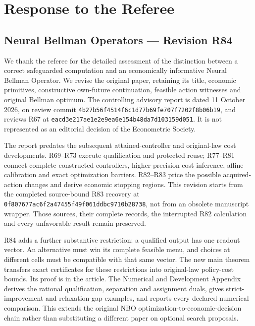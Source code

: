 \hypertarget{response-to-the-referee}{%
\section{Response to the Referee}\label{response-to-the-referee}}

\hypertarget{neural-bellman-operators-revision-r84}{%
\subsection{Neural Bellman Operators --- Revision
R84}\label{neural-bellman-operators-revision-r84}}

We thank the referee for the detailed assessment of the distinction
between a correct safeguarded computation and an economically
informative Neural Bellman Operator. We revise the original paper,
retaining its title, economic primitives, constructive own-future
continuation, feasible action witnesses and original Bellman optimum.
The controlling advisory report is dated 11 October 2026, on review
commit \texttt{4b27b56f4514f6c1d77b69fe707f7202f8b06b19}, and reviews
R67 at \texttt{eacd3e217ae1e2e9ea6e154b48da7d103159d051}. It is not
represented as an editorial decision of the Econometric Society.

The report predates the subsequent attained-controller and original-law
cost developments. R69--R73 execute qualification and protected reuse;
R77--R81 connect complete constructed controllers, higher-precision cost
inference, affine calibration and exact optimization barriers. R82--R83
price the possible acquired-action changes and derive economic stopping
regions. This revision starts from the completed source-bound R83
recovery at \texttt{0f807677ac6f2a47455f49f061ddbc9710b28738}, not from
an obsolete manuscript wrapper. Those sources, their complete records,
the interrupted R82 calculation and every unfavorable result remain
preserved.

R84 adds a further substantive restriction: a qualified output has one
readout vector. An alternative must win its complete feasible menu, and
choices at different cells must be compatible with that same vector. The
new main theorem transfers exact certificates for these restrictions
into original-law policy-cost bounds. Its proof is in the article. The
Numerical and Development Appendix derives the rational qualification,
separation and assignment duals, gives strict-improvement and
relaxation-gap examples, and reports every declared numerical
comparison. This extends the original NBO
optimization-to-economic-decision chain rather than substituting a
different paper on optional search proposals.

